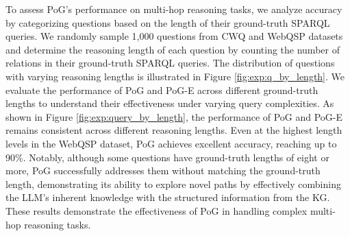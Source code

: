 To assess PoG’s performance on multi-hop reasoning tasks, we analyze accuracy by categorizing questions based on the length of their ground-truth SPARQL queries.
We randomly sample 1,000 questions from CWQ and WebQSP datasets and determine the reasoning length of each question by counting the number of relations in their ground-truth SPARQL queries. The distribution of questions with varying reasoning lengths is illustrated in Figure \ref{fig:exp:q_by_length}. We evaluate the performance of PoG and PoG-E across different ground-truth lengths to understand their effectiveness under varying query complexities.
As shown in Figure \ref{fig:exp:query_by_length}, the performance of PoG and PoG-E remains consistent across different reasoning lengths. Even at the highest length levels in the WebQSP dataset, PoG achieves excellent accuracy, reaching up to 90\%. 
Notably, although some questions have ground-truth lengths of eight or more, PoG successfully addresses them without matching the ground-truth length, demonstrating its ability to explore novel paths by effectively combining the LLM’s inherent knowledge with the structured information from the KG.
These results demonstrate the effectiveness of PoG in handling complex multi-hop reasoning tasks.


\begin{table}[t]
\vspace{-2mm}
\caption{The illustration of graph size reduction.}\label{fig:exp:graph_reduction}
\setlength\tabcolsep{1.0 pt}
\vspace{1mm}
\end{table}



